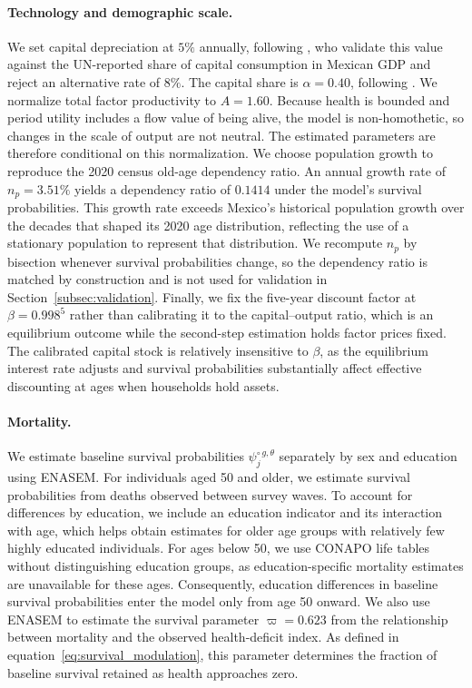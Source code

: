 \documentclass[12pt,a4paper]{article}
\begin{document}
\paragraph{Technology and demographic scale.}
We set capital depreciation at $5\%$ annually, following \citet{BergoeingKehoeKehoeSoto2002}, who validate this value against the UN-reported share of capital consumption in Mexican GDP and reject an alternative rate of $8\%$. The capital share is $\alpha=0.40$, following \citet{GarciaVerdu2005}. We normalize total factor productivity to $A=1.60$. Because health is bounded and period utility includes a flow value of being alive, the model is non-homothetic, so changes in the scale of output are not neutral. The estimated parameters are therefore conditional on this normalization. We choose population growth to reproduce the 2020 census old-age dependency ratio. An annual growth rate of $n_p=3.51\%$ yields a dependency ratio of $0.1414$ under the model's survival probabilities. This growth rate exceeds Mexico's historical population growth over the decades that shaped its 2020 age distribution, reflecting the use of a stationary population to represent that distribution. We recompute $n_p$ by bisection whenever survival probabilities change, so the dependency ratio is matched by construction and is not used for validation in Section~\ref{subsec:validation}. Finally, we fix the five-year discount factor at $\beta=0.998^5$ rather than calibrating it to the capital--output ratio, which is an equilibrium outcome while the second-step estimation holds factor prices fixed. The calibrated capital stock is relatively insensitive to $\beta$, as the equilibrium interest rate adjusts and survival probabilities substantially affect effective discounting at ages when households hold assets.

\paragraph{Mortality.}
We estimate baseline survival probabilities $\psi^{\circ\,g,\theta}_j$ separately by sex and education using ENASEM. For individuals aged 50 and older, we estimate survival probabilities from deaths observed between survey waves. To account for differences by education, we include an education indicator and its interaction with age, which helps obtain estimates for older age groups with relatively few highly educated individuals. For ages below 50, we use CONAPO life tables without distinguishing education groups, as education-specific mortality estimates are unavailable for these ages. Consequently, education differences in baseline survival probabilities enter the model only from age 50 onward. We also use ENASEM to estimate the survival parameter $\varpi=0.623$ from the relationship between mortality and the observed health-deficit index. As defined in equation~\eqref{eq:survival_modulation}, this parameter determines the fraction of baseline survival retained as health approaches zero.
\end{document}
